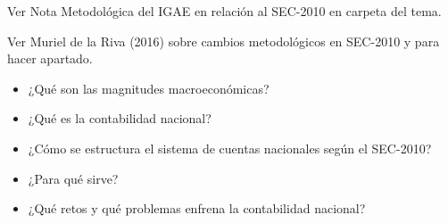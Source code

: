 \documentclass{nuevotema}
\begin{document}
\ideaclave

Ver Nota Metodológica del IGAE en relación al SEC-2010 en carpeta del tema.

Ver Muriel de la Riva (2016) sobre cambios metodológicos en SEC-2010 y para hacer apartado. 


\begin{itemize}
	\item ¿Qué son las magnitudes macroeconómicas?
	\item ¿Qué es la contabilidad nacional?
	\item ¿Cómo se estructura el sistema de cuentas nacionales según el SEC-2010?
	\item ¿Para qué sirve?
	\item ¿Qué retos y qué problemas enfrena la contabilidad nacional?
\end{itemize}

\esquemacorto
\end{document}

